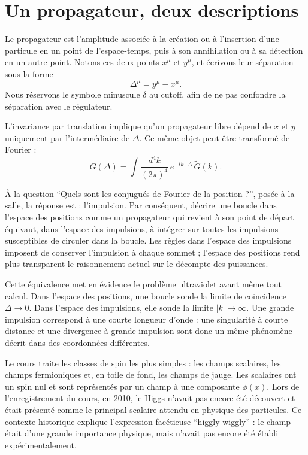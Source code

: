 \section{Un propagateur, deux descriptions}

Le propagateur est l’amplitude associée à la création ou à l’insertion d’une particule en un point de l’espace-temps, puis à son annihilation ou à sa détection en un autre point. Notons ces deux points \(x^\mu\) et \(y^\mu\), et écrivons leur séparation sous la forme
\begin{equation}
\Delta^\mu=y^\mu-x^\mu.
\end{equation}
Nous réservons le symbole minuscule \(\delta\) au cutoff, afin de ne pas confondre la séparation avec le régulateur.

L’invariance par translation implique qu’un propagateur libre dépend de \(x\) et \(y\) uniquement par l’intermédiaire de \(\Delta\). Ce même objet peut être transformé de Fourier :
\begin{equation}
G(\Delta)
=\int\frac{d^4k}{(2\pi)^4}\,e^{-ik\cdot\Delta}\,\widetilde G(k).
\end{equation}

À la question ``Quels sont les conjugués de Fourier de la position ?'', posée à la salle, la réponse est : l’impulsion. Par conséquent, décrire une boucle dans l’espace des positions comme un propagateur qui revient à son point de départ équivaut, dans l’espace des impulsions, à intégrer sur toutes les impulsions susceptibles de circuler dans la boucle. Les règles dans l’espace des impulsions imposent de conserver l’impulsion à chaque sommet ; l’espace des positions rend plus transparent le raisonnement actuel sur le décompte des puissances.

Cette équivalence met en évidence le problème ultraviolet avant même tout calcul. Dans l’espace des positions, une boucle sonde la limite de coïncidence \(\Delta\to0\). Dans l’espace des impulsions, elle sonde la limite \(|k|\to\infty\). Une grande impulsion correspond à une courte longueur d’onde : une singularité à courte distance et une divergence à grande impulsion sont donc un même phénomène décrit dans des coordonnées différentes.

Le cours traite les classes de spin les plus simples : les champs scalaires, les champs fermioniques et, en toile de fond, les champs de jauge. Les scalaires ont un spin nul et sont représentés par un champ à une composante \(\phi(x)\). Lors de l’enregistrement du cours, en 2010, le Higgs n’avait pas encore été découvert et était présenté comme le principal scalaire attendu en physique des particules. Ce contexte historique explique l’expression facétieuse ``higgly-wiggly'' : le champ était d’une grande importance physique, mais n’avait pas encore été établi expérimentalement.

